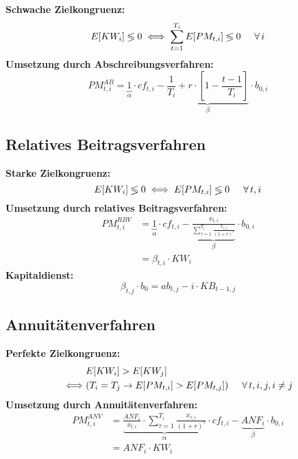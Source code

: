 \documentclass[leqno]{scrartcl}
\begin{document}
\begin{multicols}{4}
\textbf{Schwache Zielkongruenz:}
  \begin{equation*}
    E[KW_i] \lessgtr 0 \iff \sum^{T_i}_{t=1} E[PM_{t,i}] \lessgtr 0 \hspace{0.5cm} \forall\,i
  \end{equation*}
\textbf{Umsetzung durch Abschreibungsverfahren:}
  \begin{equation*}
    PM^{AB}_{t,i} = \underbrace{1}_{\alpha} \cdot cf_{t,i} - \underbrace{\frac{1}{T_i}+r \cdot \left[1-\frac{t-1}{T_i}\right]}_{\beta} \cdot b_{0,i}
  \end{equation*}

\subsection{Relatives Beitragsverfahren}

\textbf{Starke Zielkongruenz:}
  \begin{equation*}
    E[KW_i] \lessgtr 0 \iff E[PM_{t,i}] \lessgtr 0 \hspace{0.5cm} \forall\, t,i
  \end{equation*}
\textbf{Umsetzung durch relatives Beitragsverfahren:}
  \begin{equation*}
    \begin{split}
    PM^{RBV}_{t,i} &= \underbrace{1}_{\alpha} \cdot cf_{t,i} - \underbrace{\frac{x_{t,i}}{\sum^{T_i}_{\tau=1}\frac{x_{\tau,i}}{(1+r)^{\tau}}}}_{\beta} \cdot b_{0,i}\\
      & = \beta_{t,i} \cdot KW_i
    \end{split}
  \end{equation*}
\textbf{Kapitaldienst:}
  \begin{equation*}
    \beta_{t,j} \cdot b_0 = ab_{t,j} - i\cdot KB_{t-1,j}
  \end{equation*}

\subsection{Annuitätenverfahren}

\textbf{Perfekte Zielkongruenz:}
  \begin{align*}
    &E[KW_i] > E[KW_j]\\
    \iff & ( T_i = T_j \to E[PM_{t,i}] > E[PM_{t,j}]) \hspace{0.5cm} \forall\, t,i,j,i \neq j
  \end{align*}
\textbf{Umsetzung durch Annuitätenverfahren:}
  \begin{equation*}
    \begin{split}
        PM^{ANV}_{t,i} &= \underbrace{\frac{ANF_i}{x_{t,i}} \cdot \sum^{T_i}_{\tau=1}\frac{x_{\tau,i}}{(1+r)^{\tau}}}_{\alpha} \cdot cf_{t,i} - \underbrace{ANF_i}_{\beta} \cdot b_{0,i}\\
 & = ANF_i \cdot KW_i
    \end{split}
  \end{equation*}


\end{multicols}
\end{document}
